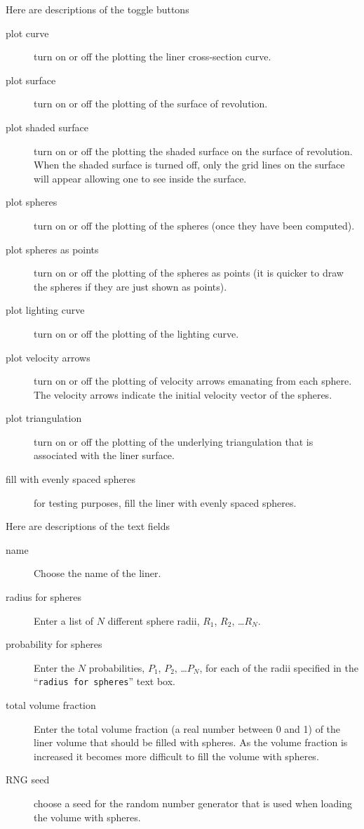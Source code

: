 \documentclass[12pt]{article}
\newcommand{\cmd}[1]{``{\tt #1}''}
\begin{document}
Here are descriptions of the toggle buttons
\begin{description}
  \item[plot curve] turn on or off the plotting the liner cross-section curve.
  \item[plot surface] turn on or off the plotting of the surface of revolution. 
  \item[plot shaded surface] turn on or off the plotting the shaded surface on the surface of revolution. When the
    shaded surface is turned off, only the grid lines on the surface will appear allowing
    one to see inside the surface.
  \item[plot spheres] turn on or off the plotting of the spheres (once they have been computed).
  \item[plot spheres as points] turn on or off the plotting of the spheres as points (it is quicker to draw the
     spheres if they are just shown as points).
  \item[plot lighting curve] turn on or off the plotting of the lighting curve.
  \item[plot velocity arrows] turn on or off the plotting of velocity arrows emanating from each sphere. The velocity
    arrows indicate the initial velocity vector of the spheres.
  \item[plot triangulation] turn on or off the plotting of the underlying triangulation that is associated with 
    the liner surface. 
  \item[fill with evenly spaced spheres] for testing purposes, fill the liner with 
     evenly spaced spheres.
\end{description}

Here are descriptions of the text fields
\begin{description}
  \item[name] Choose the name of the liner.
  \item[radius for spheres] Enter a list of $N$ different sphere radii, $R_1$, $R_2$, \ldots $R_N$. 
  \item[probability for spheres] Enter the $N$ probabilities,  $P_1$, $P_2$, \ldots $P_N$,
                for each of the radii specified in the 
    \cmd{radius for spheres} text box.
  \item[total volume fraction] Enter the total volume fraction (a real number between 0 and 1)
    of the liner volume
    that should be filled with spheres. As the volume fraction is increased it becomes
    more difficult to fill the volume with spheres.
  \item[RNG seed] choose a seed for the random number generator that is used when loading the
    volume with spheres.
\end{description}
\end{document}
